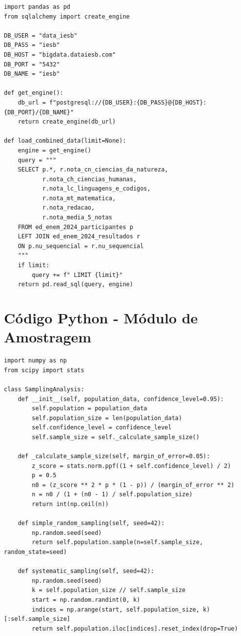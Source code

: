 \documentclass[12pt,a4paper]{article}
\begin{document}
\begin{lstlisting}
import pandas as pd
from sqlalchemy import create_engine

DB_USER = "data_iesb"
DB_PASS = "iesb"
DB_HOST = "bigdata.dataiesb.com"
DB_PORT = "5432"
DB_NAME = "iesb"

def get_engine():
    db_url = f"postgresql://{DB_USER}:{DB_PASS}@{DB_HOST}:{DB_PORT}/{DB_NAME}"
    return create_engine(db_url)

def load_combined_data(limit=None):
    engine = get_engine()
    query = """
    SELECT p.*, r.nota_cn_ciencias_da_natureza,
           r.nota_ch_ciencias_humanas,
           r.nota_lc_linguagens_e_codigos,
           r.nota_mt_matematica,
           r.nota_redacao,
           r.nota_media_5_notas
    FROM ed_enem_2024_participantes p
    LEFT JOIN ed_enem_2024_resultados r 
    ON p.nu_sequencial = r.nu_sequencial
    """
    if limit:
        query += f" LIMIT {limit}"
    return pd.read_sql(query, engine)
\end{lstlisting}

\section{Código Python - Módulo de Amostragem}

\begin{lstlisting}
import numpy as np
from scipy import stats

class SamplingAnalysis:
    def __init__(self, population_data, confidence_level=0.95):
        self.population = population_data
        self.population_size = len(population_data)
        self.confidence_level = confidence_level
        self.sample_size = self._calculate_sample_size()
    
    def _calculate_sample_size(self, margin_of_error=0.05):
        z_score = stats.norm.ppf((1 + self.confidence_level) / 2)
        p = 0.5
        n0 = (z_score ** 2 * p * (1 - p)) / (margin_of_error ** 2)
        n = n0 / (1 + (n0 - 1) / self.population_size)
        return int(np.ceil(n))
    
    def simple_random_sampling(self, seed=42):
        np.random.seed(seed)
        return self.population.sample(n=self.sample_size, random_state=seed)
    
    def systematic_sampling(self, seed=42):
        np.random.seed(seed)
        k = self.population_size // self.sample_size
        start = np.random.randint(0, k)
        indices = np.arange(start, self.population_size, k)[:self.sample_size]
        return self.population.iloc[indices].reset_index(drop=True)
\end{lstlisting}
\end{document}
